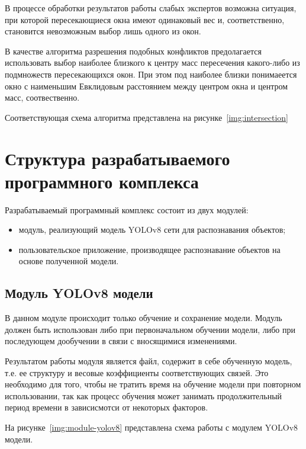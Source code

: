 В процессе обработки результатов работы слабых экспертов возможна ситуация, при которой пересекающиеся окна имеют одинаковый вес и, соответственно, становится невозможным выбор лишь одного из окон. 

В качестве алгоритма разрешения подобных конфликтов предолагается использовать выбор наиболее близкого к центру масс пересечения какого-либо из подмножеств пересекающихся окон. При этом под наиболее близки понимаеется окно с наименьшим Евклидовым расстоянием между центром окна и центром масс, соотвественно.

Соответствующая схема алгоритма представлена на рисунке~\ref{img:intersection}



\section{Структура разрабатываемого программного комплекса}

Разрабатываемый программный комплекс состоит из двух модулей:
\begin{itemize}[label=---]
    \item модуль, реализующий модель YOLOv8 сети для распознавания объектов;
    \item пользовательское приложение, производящее распознавание объектов на основе полученной модели.
\end{itemize}

\subsection*{Модуль YOLOv8 модели}

В данном модуле происходит только обучение и сохранение модели. Модуль должен быть использован либо при первоначальном обучении модели, либо при последующем дообучении в связи с вносящимися изменениями.

Результатом работы модуля является файл, содержит в себе обученную модель, т.е. ее структуру и весовые коэффициенты соответствующих связей. Это необходимо для того, чтобы не тратить время на обучение модели при повторном использовании, так как процесс обучения может занимать продолжительный период времени в зависисмотси от некоторых факторов.

На рисунке~\ref{img:module-yolov8} представлена схема работы с модулем YOLOv8 модели.




